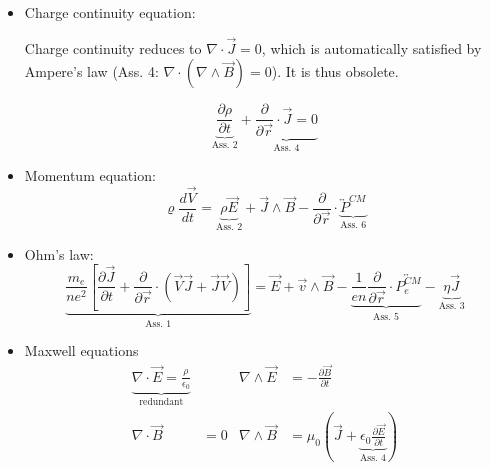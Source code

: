 \begin{itemize}


\item Charge continuity equation:

Charge continuity reduces to $\nabla \cdot \vec{J} = 0$, which is automatically 
satisfied by Ampere's law (Ass. 4: $\nabla \cdot (\nabla \wedge \vec{B}) = 0$). It is thus obsolete.

\[
\underbrace{\frac{\partial \rho}{\partial t}}_{\text{Ass. 2}} + \underbrace{\frac{\partial}{\partial \vec{r}} \cdot \vec{J} = 0}_{\text{Ass. 4}}
\]

\item Momentum equation:
\[
\varrho \frac{d\vec{V}}{dt} = \underbrace{\rho \vec{E}}_{\text{Ass. 2}} + \vec{J} \wedge \vec{B} - \frac{\partial}{\partial \vec{r}} \cdot \underbrace{\overleftrightarrow{P}^{CM}}_{\text{Ass. 6}}
\]

\item Ohm's law:
\[
\underbrace{\frac{m_e}{n e^2} \left[\frac{\partial \vec{J}}{\partial t} + \frac{\partial}{\partial \vec{r}} \cdot (\vec{V}\vec{J} + \vec{J}\vec{V})\right]}_{\text{Ass. 1}} = \vec{E} + \vec{v} \wedge \vec{B} - \underbrace{\frac{1}{en} \frac{\partial}{\partial \vec{r}} \cdot \overleftrightarrow{P^{CM}_e}}_{\text{Ass. 5}}- \underbrace{\eta \vec{J}}_{\text{Ass. 3}}
\]
\end{itemize}



\begin{itemize}

\item Maxwell equations
\begin{align*}
\underbrace{\nabla \cdot \vec{E} = \frac{\rho}{\epsilon_0}}_{\text{redundant}} & & \nabla \wedge \vec{E} &= -\frac{\partial \vec{B}}{\partial t} \\
\nabla \cdot \vec{B} &= 0 & \nabla \wedge \vec{B} &= \mu_0 \left(\vec{J} + \underbrace{\epsilon_0 \frac{\partial \vec{E}}{\partial t}}_{\text{Ass. 4}}\right)
\end{align*}
\end{itemize}





